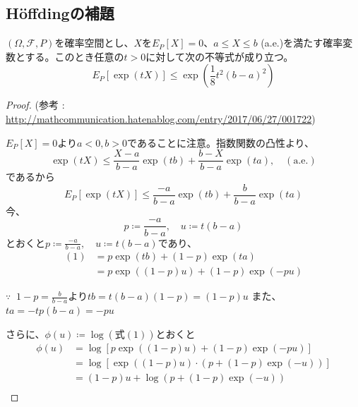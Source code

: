         \subsection{H\"{o}ffdingの補題}
            \begin{shadebox}
                $(\Omega,\mathcal{F},P)$を確率空間とし、$X$を$E_{P}[X]=0$、$a\leq X\leq b$ (a.e.)を満たす確率変数とする。このとき任意の$t>0$に対して次の不等式が成り立つ。
                \[E_{P}[\exp(tX)]\le\exp\left(\frac{1}{8}t^{2}(b-a)^{2}\right)\]
            \end{shadebox}
            \begin{proof}
                \quad\par
                (参考 : \url{http://mathcommunication.hatenablog.com/entry/2017/06/27/001722})
                \par
                $E_{P}[X]=0$より$a<0,b>0$であることに注意。指数関数の凸性より、
                \[\exp(tX)\le\frac{X-a}{b-a}\exp(tb)+\frac{b-X}{b-a}\exp(ta),\quad(\mathrm{a.e.})\]
                であるから
                \begin{equation}
                    E_{P}[\exp(tX)]\le\frac{-a}{b-a}\exp(tb)+\frac{b}{b-a}\exp(ta)
                \end{equation}
                今、
                \[\displaystyle p\coloneqq\frac{-a}{b-a},\quad u\coloneqq t(b-a)\]
                とおくと$\displaystyle p\coloneqq\frac{-a}{b-a},\quad u\coloneqq t(b-a)$であり、
                \begin{align*}
                    (1) &= p\exp(tb)+(1-p)\exp(ta)\\
                    &= p\exp((1-p)u)+(1-p)\exp(-pu)
                \end{align*}
                \begin{screen}
                    $\because\;\;1-p=\frac{b}{b-a}$より$tb = t(b-a)(1-p) = (1-p)u$ また、$ta = -tp(b-a) = -pu$
                \end{screen}
                さらに、$\phi(u) \coloneqq \log{\left(\textrm{式}(1)\right)}$とおくと
                \begin{align*}
                    \phi(u) &= \log\left[p\exp( (1-p)u)+(1-p)\exp(-pu)\right]\\
                    &= \log\left[\exp( (1-p)u)\cdot(p+(1-p)\exp(-u))\right]\\
                    &= (1-p)u+\log(p+(1-p)\exp(-u))
                \end{align*}
                \begin{gather*}

\end{gather*}
\end{proof}

